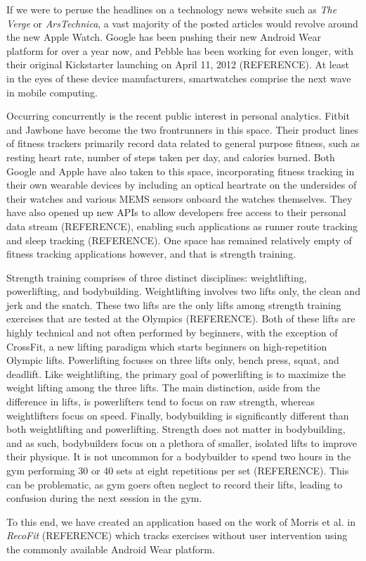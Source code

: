 If we were to peruse the headlines on a technology news website such as \textit{The Verge} or \textit{ArsTechnica}, a vast majority of the posted articles would revolve around the new Apple Watch. Google has been pushing their new Android Wear platform for over a year now, and Pebble has been working for even longer, with their original Kickstarter launching on April 11, 2012 (REFERENCE). At least in the eyes of these device manufacturers, smartwatches comprise the next wave in mobile computing. 

Occurring concurrently is the recent public interest in personal analytics. Fitbit and Jawbone have become the two frontrunners in this space. Their product lines of fitness trackers primarily record data related to general purpose fitness, such as resting heart rate, number of steps taken per day, and calories burned. Both Google and Apple have also taken to this space, incorporating fitness tracking in their own wearable devices by including an optical heartrate on the undersides of their watches and various MEMS sensors onboard the watches themselves. They have also opened up new APIs to allow developers free access to their personal data stream (REFERENCE), enabling such applications as runner route tracking and sleep tracking (REFERENCE). One space has remained relatively empty of fitness tracking applications however, and that is strength training.

Strength training comprises of three distinct disciplines: weightlifting, powerlifting, and bodybuilding. Weightlifting involves two lifts only, the clean and jerk and the snatch. These two lifts are the only lifts among strength training exercises that are tested at the Olympics (REFERENCE). Both of these lifts are highly technical and not often performed by beginners, with the exception of CrossFit, a new lifting paradigm which starts beginners on high-repetition Olympic lifts. Powerlifting focuses on three lifts only, bench press, squat, and deadlift. Like weightlifting, the primary goal of powerlifting is to maximize the weight lifting among the three lifts. The main distinction, aside from the difference in lifts, is powerlifters tend to focus on raw strength, whereas weightlifters focus on speed. Finally, bodybuilding is significantly different than both weightlifting and powerlifting. Strength does not matter in bodybuilding, and as such, bodybuilders focus on a plethora of smaller, isolated lifts to improve their physique. It is not uncommon for a bodybuilder to spend two hours in the gym performing 30 or 40 sets at eight repetitions per set (REFERENCE). This can be problematic, as gym goers often neglect to record their lifts, leading to confusion during the next session in the gym. 

To this end, we have created an application based on the work of Morris et al. in \textit{RecoFit} (REFERENCE) which tracks exercises without user intervention using the commonly available Android Wear platform. 